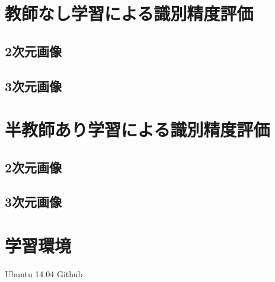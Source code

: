 \section{教師なし学習による識別精度評価}
\subsection*{2次元画像}
\subsection*{3次元画像}

\section{半教師あり学習による識別精度評価}
\subsection*{2次元画像}
\subsection*{3次元画像}

\section{学習環境}
Ubuntu 14.04
Github
